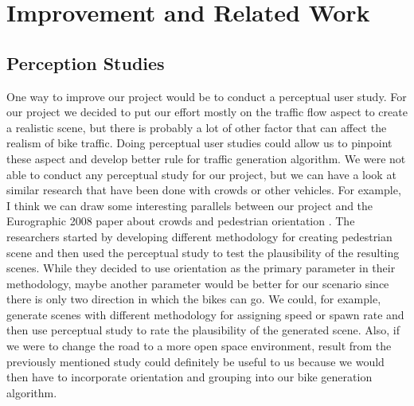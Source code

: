\documentclass{scrartcl}
\begin{document}
\section{Improvement and Related Work}
	
	\subsection{Perception Studies} 
        One way to improve our project would be to conduct a perceptual user study. For
        our project we decided to put our effort mostly on the traffic flow aspect to
        create a realistic scene, but there is probably a lot of other factor that can
        affect the realism of bike traffic. Doing perceptual user studies could allow us
        to pinpoint these aspect and develop better rule for traffic generation
        algorithm. We were not able to conduct any perceptual study for our project, but
        we can have a look at similar research that have been done with crowds or other
        vehicles. For example, I think we can draw some interesting parallels between
        our project and the Eurographic 2008 paper about crowds and pedestrian
        orientation \citep{peters2008crowds}. The researchers started by developing
        different methodology for creating pedestrian scene and then used the perceptual
        study to test the plausibility of the resulting scenes. While they decided to
        use orientation as the primary parameter in their methodology, maybe another
        parameter would be better for our scenario since there is only two direction in
        which the bikes can go. We could, for example, generate scenes with different
        methodology for assigning speed or spawn rate and then use perceptual study to
        rate the plausibility of the generated scene. Also, if we were to change the
        road to a more open space environment, result from the previously mentioned
        study could definitely be useful to us because we would then have to incorporate
        orientation and grouping into our bike generation algorithm.
		
\end{document}
